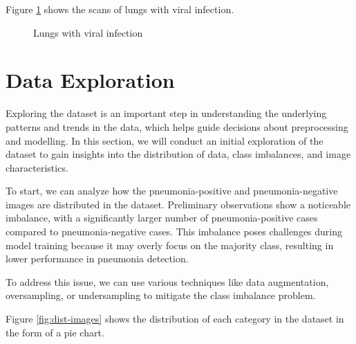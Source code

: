 \documentclass[9pt,twocolumn,twoside]{opticajnl}
\begin{document}
Figure \ref{fig:virus-lung-scans} shows the scans of lungs with viral infection.

\begin{figure}[ht]
\centering
{}
\caption{Lungs with viral infection}
\label{fig:virus-lung-scans}
\end{figure}

\section{Data Exploration}

Exploring the dataset is an important step in understanding the underlying patterns and trends in the data, which helps guide decisions about preprocessing and modelling. In this section, we will conduct an initial exploration of the dataset to gain insights into the distribution of data, class imbalances, and image characteristics.

To start, we can analyze how the pneumonia-positive and pneumonia-negative images are distributed in the dataset. Preliminary observations show a noticeable imbalance, with a significantly larger number of pneumonia-positive cases compared to pneumonia-negative cases. This imbalance poses challenges during model training because it may overly focus on the majority class, resulting in lower performance in pneumonia detection.

To address this issue, we can use various techniques like data augmentation, oversampling, or undersampling to mitigate the class imbalance problem.

Figure \ref{fig:dist-images} shows the distribution of each category in the dataset in the form of a pie chart.
\end{document}
